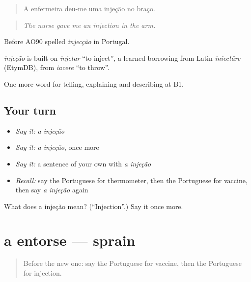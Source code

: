 \begin{quote}
A enfermeira deu-me uma injeção no braço.
\end{quote}

\begin{quote}
\emph{The nurse gave me an injection in the arm.}
\end{quote}

Before AO90 spelled \emph{injecção} in Portugal.

\begin{cousinweb}
\emph{injeção} is built on \emph{injetar} \textquotedblleft{}to inject\textquotedblright{}, a learned borrowing from Latin \emph{iniectāre} (EtymDB), from \emph{iacere} \textquotedblleft{}to throw\textquotedblright{}.
\end{cousinweb}

\begin{grammarlens}[title={What you've built}]
One more word for telling, explaining and describing at B1.
\end{grammarlens}

\subsection*{Your turn}
\begin{itemize}
\raggedright
  \item \emph{Say it:} \emph{a injeção}
  \item \emph{Say it:} \emph{a injeção}, once more
  \item \emph{Say it:} a sentence of your own with \emph{a injeção}
  \item \emph{Recall:} say the Portuguese for thermometer, then the Portuguese for vaccine, then say \emph{a injeção} again
\end{itemize}

\begin{tcolorbox}[breakable,colback=teal!4,colframe=teal!35!black,title={Before you move on}]
What does a injeção mean? (\textquotedblleft{}Injection\textquotedblright{}.) Say it once more.
\end{tcolorbox}
\section[a entorse]{a entorse — sprain}

\label{lesson:PT-C486-entorse}



\begin{quote}
Before the new one: say the Portuguese for vaccine, then the Portuguese for injection.
\end{quote}

